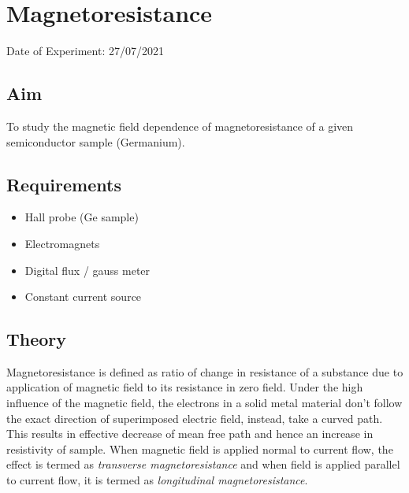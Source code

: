 


	
	\chapter{Magnetoresistance} %
	\vspace{-1cm}
	
	\begin{center}%
		Date of Experiment: 27/07/2021
	\end{center}
	
	
	\section{Aim}
	To study the magnetic field dependence of magnetoresistance of a given semiconductor sample (Germanium).
	
	\section{Requirements}
	\begin{itemize}
		\item 	Hall probe (Ge sample)
		\item 	Electromagnets
		\item 	Digital flux / gauss meter
		\item 	Constant current source
	\end{itemize}
	
	\section{Theory}
	Magnetoresistance is defined as ratio of change in resistance of a substance due to application of magnetic field to its resistance in zero field. Under the high influence of the magnetic field, the electrons in a solid metal material don't follow the exact direction of superimposed electric field, instead, take a curved path. This results in effective decrease of mean free path and hence an increase in resistivity of sample. When magnetic field is applied normal to current flow, the effect is termed as \emph{transverse magnetoresistance} and when field is applied parallel to current flow, it is termed as \emph{longitudinal magnetoresistance}.
	
